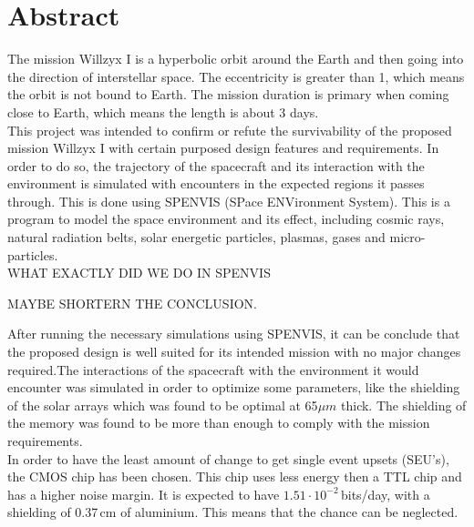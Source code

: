 {}
\section*{\label{sec:abstract}Abstract}
The mission Willzyx I is a hyperbolic orbit around the Earth and then going into the direction of interstellar space. The eccentricity is greater than 1, which means the orbit is not bound to Earth. The mission duration is primary when coming close to Earth, which means the length is about 3 days.\\

This project was intended to confirm or refute the survivability of the proposed mission Willzyx I with certain purposed design features and requirements. In order to do so, the trajectory of the spacecraft and its interaction with the environment is simulated with encounters in the expected regions it passes through. This is done using SPENVIS (SPace ENVironment System). This is a program to model the space environment and its effect, including cosmic rays, natural radiation belts, solar energetic particles, plasmas, gases and micro-particles.\\

WHAT EXACTLY DID WE DO IN SPENVIS

MAYBE SHORTERN THE CONCLUSION.

After running the necessary simulations using SPENVIS, it can be conclude that the proposed design is well suited for its intended mission with no major changes required.The interactions of the spacecraft with the environment it would encounter was simulated in order to optimize some parameters, like the shielding of the solar arrays which was found to be optimal at 65$\mu m$ thick. The shielding of the memory was found to be more than enough to comply with the mission requirements. \\

In order to have the least amount of change to get single event upsets (SEU's), the CMOS chip has been chosen. This chip uses less energy then a TTL chip and has a higher noise margin. It is expected to have $1.51 \cdot 10^{-2}$\,bits/day, with a shielding of 0.37\,cm of aluminium. This means that the chance can be neglected.
